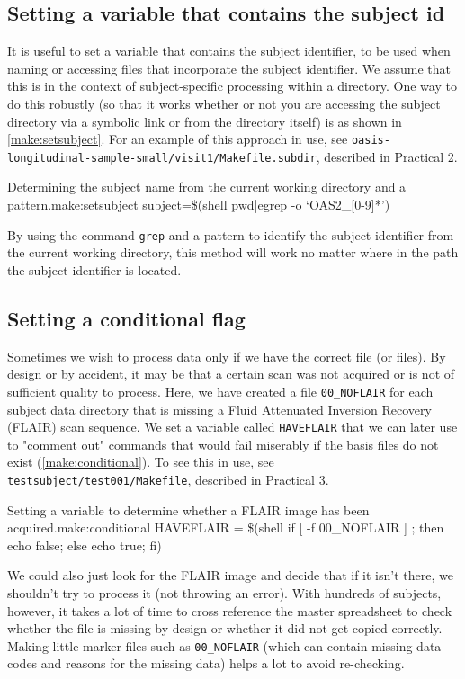 \subsection{Setting a variable that contains the subject id }
It is useful to set a variable that contains the subject identifier, to be used when naming or accessing files that incorporate the subject identifier. We assume that this is in the context of subject-specific processing within a directory. One way to do this robustly (so that it works whether or not you are accessing the subject directory via a symbolic link or from the directory itself) is as shown in \autoref{make:setsubject}. For an example of this approach in use, see \texttt{oasis-longitudinal-sample-small/visit1/Makefile.subdir}, described in Practical 2.

\begin{make}{Determining the subject name from the current working directory and a pattern.}{make:setsubject}
subject=\$(shell pwd|egrep -o `{}OAS2_[0-9]*')
\end{make}

By using the command \texttt{grep} and a pattern to identify the subject identifier from the current working directory, this method will work no matter where in the path the subject identifier is located.

\subsection{Setting a conditional flag }

Sometimes we wish to process data only if we have the correct file (or files). By design or by accident, it may be that a certain scan was not acquired or is not of sufficient quality to process. Here, we have created a file \texttt{00\_NOFLAIR} for each subject data directory that is missing a Fluid Attenuated Inversion Recovery (FLAIR) scan sequence. We set a variable called \texttt{HAVEFLAIR} that we can later use to "comment out" commands that would fail miserably if the basis files do not exist (\autoref{make:conditional}). To see this in use, see \texttt{testsubject/test001/Makefile}, described in Practical 3.

\begin{make}{Setting a variable to determine whether a FLAIR image has been acquired.}{make:conditional}
HAVEFLAIR = \$(shell if [ -f 00_NOFLAIR ] ; then echo false; else echo true; fi)
\end{make}

We could also just look for the FLAIR image and decide that if it isn't there, we shouldn't try to process it (not throwing an error). With hundreds of subjects, however, it takes a lot of time to cross reference the master spreadsheet to check whether the file is missing by design or whether it did not get copied correctly. Making little marker files such as \texttt{00\_NOFLAIR} (which can contain missing data codes and reasons for the missing data) helps a lot to avoid re-checking.  


